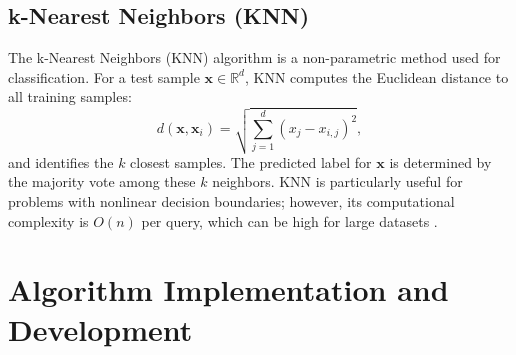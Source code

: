 \documentclass[11pt]{amsart}
\begin{document}
\subsection{k-Nearest Neighbors (KNN)}
The k-Nearest Neighbors (KNN) algorithm is a non-parametric method used for classification. For a test sample \(\mathbf{x} \in \mathbb{R}^d\), KNN computes the Euclidean distance to all training samples:
\[
d(\mathbf{x}, \mathbf{x}_i) = \sqrt{\sum_{j=1}^{d} \left(x_j - x_{i,j}\right)^2},
\]
and identifies the \(k\) closest samples. The predicted label for \(\mathbf{x}\) is determined by the majority vote among these \(k\) neighbors. KNN is particularly useful for problems with nonlinear decision boundaries; however, its computational complexity is \(O(n)\) per query, which can be high for large datasets \cite{Cover1967}.


\section{Algorithm Implementation and Development}
\end{document}
